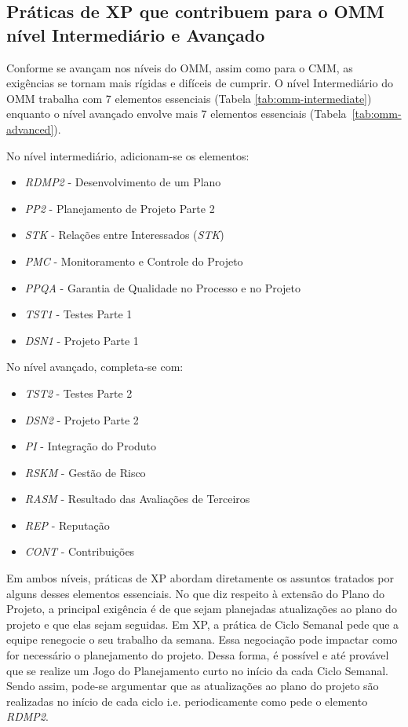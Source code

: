 \subsection{Práticas de XP que contribuem para o OMM nível
  Intermediário e Avançado}
\label{sec:xp-omm-intermediate}

Conforme se avançam nos níveis do OMM, assim como para o CMM, as
exigências se tornam mais rígidas e difíceis de cumprir. O nível
Intermediário do OMM trabalha com 7 elementos essenciais (Tabela
\ref{tab:omm-intermediate}) enquanto o nível avançado envolve mais 7
elementos essenciais (Tabela~\ref{tab:omm-advanced}).

No nível intermediário, adicionam-se os elementos:
\begin{itemize}
\item \textit{RDMP2} - Desenvolvimento de um Plano
\item \textit{PP2} - Planejamento de Projeto Parte 2
\item \textit{STK} - Relações entre Interessados (\textit{STK})
\item \textit{PMC} - Monitoramento e Controle do Projeto
\item \textit{PPQA} - Garantia de Qualidade no Processo e no Projeto
\item \textit{TST1} - Testes Parte 1
\item \textit{DSN1} - Projeto Parte 1
\end{itemize}

No nível avançado, completa-se com:
\begin{itemize}
\item \textit{TST2} - Testes Parte 2
\item \textit{DSN2} - Projeto Parte 2
\item \textit{PI} - Integração do Produto
\item \textit{RSKM} - Gestão de Risco
\item \textit{RASM} - Resultado das Avaliações de Terceiros
\item \textit{REP} - Reputação
\item \textit{CONT} - Contribuições
\end{itemize}

Em ambos níveis, práticas de XP abordam diretamente os assuntos
tratados por alguns desses elementos essenciais. No que diz respeito à
extensão do Plano do Projeto, a principal exigência é de que sejam
planejadas atualizações ao plano do projeto e que elas sejam
seguidas. Em XP, a prática de Ciclo Semanal pede que a equipe
renegocie o seu trabalho da semana. Essa negociação pode impactar como
for necessário o planejamento do projeto. Dessa forma, é possível e
até provável que se realize um Jogo do Planejamento curto no início da
cada Ciclo Semanal. Sendo assim, pode-se argumentar que as
atualizações ao plano do projeto são realizadas no início de cada
ciclo i.e. periodicamente como pede o elemento \textit{RDMP2}.

